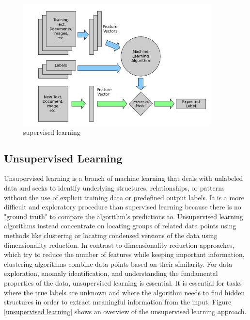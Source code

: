 \documentclass[a4paper,12pt]{report}%
\renewcommand{\\}{\vspace*{0.5\baselineskip} \newline}
\begin{document}
\begin{figure}[h]
\centering
	\includegraphics[scale=1.5]{images/supervised learning.png}\\
	\begin{footnotesize}
		\caption{supervised learning\cite{42}}
		\label{supervised learning}
	\end{footnotesize}
\end{figure}


\subsection{Unsupervised Learning}
Unsupervised learning is a branch of machine learning that deals with unlabeled data and seeks to identify underlying structures, relationships, or patterns without the use of explicit training data or predefined output labels. It is a more difficult and exploratory procedure than supervised learning because there is no "ground truth" to compare the algorithm's predictions to. Unsupervised learning algorithms instead concentrate on locating groups of related data points using methods like clustering or locating condensed versions of the data using dimensionality reduction. In contrast to dimensionality reduction approaches, which try to reduce the number of features while keeping important information, clustering algorithms combine data points based on their similarity. For data exploration, anomaly identification, and understanding the fundamental properties of the data, unsupervised learning is essential. It is essential for tasks where the true labels are unknown and where the algorithm needs to find hidden structures in order to extract meaningful information from the input. Figure \ref{unsupervised learning} shows an overview of the unsupervised learning
approach.
\end{document}
